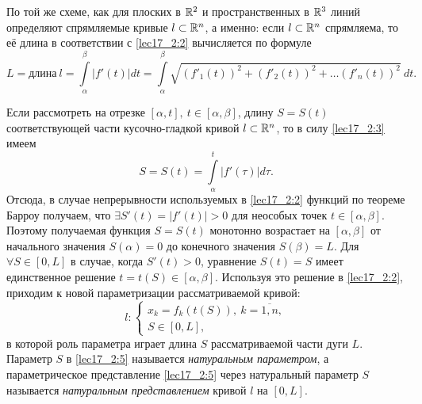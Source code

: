 \documentclass[../../main.tex]{subfiles}
\begin{document}
По той же схеме, как для плоских в $\mathbb{R}^2$ и пространственных в $\mathbb{R}^3$ 
линий определяют спрямляемые кривые $l \subset \mathbb{R}^n$, а именно:
если $l \subset \mathbb{R}^n$ спрямляема, то её длина 
в соответствии с \eqref{lec17_2:2}
вычисляется по формуле
\begin{equation}
 \label{lec17_2:3}
 L = \text{длина}\ l = \int\limits_\alpha^\beta|f'(t)|dt =  
 \int\limits_\alpha^\beta\sqrt{(f'_1(t))^2 + (f'_2(t))^2 
 + \dots (f'_n(t))^2}\:dt.
\end{equation}

Если рассмотреть на отрезке $[\alpha, t],\ t \in \left[\alpha, \beta\right]$,
длину $S = S(t)$ соответствующей части кусочно-гладкой 
кривой $l \subset \mathbb{R}^n$, 
то в силу \eqref{lec17_2:3} имеем
\begin{equation}
\label{lec17_2:4}
 S = S(t) = \int\limits_\alpha^t|f'(\tau)|d\tau.
\end{equation}
Отсюда, в случае непрерывности используемых в \eqref{lec17_2:2} 
функций по теореме Барроу получаем, что $\exists S'(t) = |f'(t)|>0$
для неособых точек $t \in \left[\alpha, \beta \right]$.
Поэтому получаемая функция $S = S(t)$ монотонно возрастает 
на $\left[\alpha, \beta \right]$ от начального значения  $S(\alpha) = 0$ 
до конечного значения $S(\beta) = L$.
Для $\forall S \in \left[0, L \right]$ в случае, когда $S'(t) > 0$, уравнение
$S(t) = S$ имеет единственное решение 
$t = t(S) \in \left[\alpha, \beta \right]$.
Используя это решение в \eqref{lec17_2:2}, приходим к новой параметризации
рассматриваемой кривой:
\begin{equation}
 \label{lec17_2:5}
 l:
 \begin{cases}
      x_k = f_k(t(S)),\ k = \overline{1,n},\\
      S \in \left[0, L \right],
 \end{cases}
\end{equation}
в которой роль параметра играет длина $S$ рассматриваемой части дуги $L$.
Параметр $S$ в \eqref{lec17_2:5} называется \emph{натуральным параметром}, 
а параметрическое представление \eqref{lec17_2:5} через натуральный параметр $S$
называется \emph{натуральным представлением} кривой $l$ на $[0, L]$.
\end{document}

